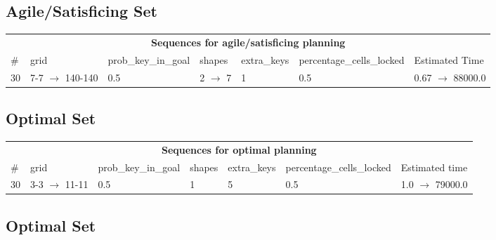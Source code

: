 \documentclass{article}
\begin{document}
                         \subsection*{Agile/Satisficing Set}

                        \begin{center}
                        \begin{tabular}{@{}l|l|l|l|l|l|l@{}}
                        \multicolumn{7}{c}{\bf \large Sequences for agile/satisficing planning}\\
                        \# & grid & prob\_key\_in\_goal & shapes & extra\_keys & percentage\_cells\_locked & Estimated Time\\\midrule
                        30&7-7 $\rightarrow$ 140-140&0.5&2 $\rightarrow$ 7&1&0.5&0.67 $\rightarrow$ 88000.0
                        \end{tabular}
                        \end{center}
                    
                            \subsection*{Optimal Set}

                            \begin{center}
                            \begin{tabular}{@{}l|l|l|l|l|l|l@{}}
                            \multicolumn{7}{c}{\bf \large Sequences for optimal planning}\\
                            \# & grid & prob\_key\_in\_goal & shapes & extra\_keys & percentage\_cells\_locked & Estimated time\\\midrule
                            30&3-3 $\rightarrow$ 11-11&0.5&1&5&0.5&1.0 $\rightarrow$ 79000.0
                            \end{tabular}
                            \end{center}
                    
                                \subsection*{Optimal Set}
                                
\end{document}
